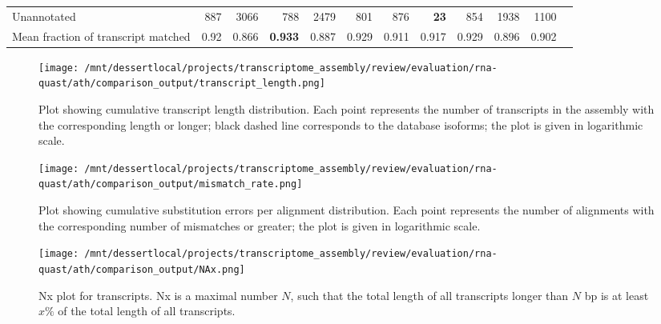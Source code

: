 \documentclass[12pt,a4paper]{article}
\begin{document}
\begin{table}[t]
\begin{adjustbox}{width=1\textwidth}
\begin{tabular}{|l*{11}{|r}|}
Unannotated                                             & 887                    & 3066                   & 788                    & 2479                   & 801                    & 876                    & \textbf{23}            & 854                    & 1938                   & 1100                   \\
Mean fraction of transcript matched                     & 0.92                   & 0.866                  & \textbf{0.933}         & 0.887                  & 0.929                  & 0.911                  & 0.917                  & 0.929                  & 0.896                  & 0.902                  \\ \hline
\end{tabular}
\end{adjustbox}
\end{table}

\FloatBarrier
\clearpage
{}

\begin{figure}[t]
\centering
\texttt{[image: /mnt/dessertlocal/projects/transcriptome\_assembly/review/evaluation/rna-quast/ath/comparison\_output/transcript\_length.png]}
\caption{Plot showing cumulative transcript length distribution. Each point represents the number of transcripts in the assembly with the corresponding length or longer; black dashed line corresponds to the database isoforms; the plot is given in logarithmic scale.}
\end{figure}
\FloatBarrier
\clearpage


\begin{figure}[t]
\centering
\texttt{[image: /mnt/dessertlocal/projects/transcriptome\_assembly/review/evaluation/rna-quast/ath/comparison\_output/mismatch\_rate.png]}
\caption{Plot showing cumulative substitution errors per alignment distribution. Each point represents the number of alignments with the corresponding number of mismatches or greater; the plot is given in logarithmic scale.}
\end{figure}
\FloatBarrier
\clearpage


\begin{figure}[t]
\centering
\texttt{[image: /mnt/dessertlocal/projects/transcriptome\_assembly/review/evaluation/rna-quast/ath/comparison\_output/NAx.png]}
\caption{Nx plot for transcripts. Nx is a maximal number $N$, such that the total length of all transcripts longer than $N$ bp is at least $x\%$ of the total length of all transcripts.}
\end{figure}
\FloatBarrier
\clearpage
\end{document}
